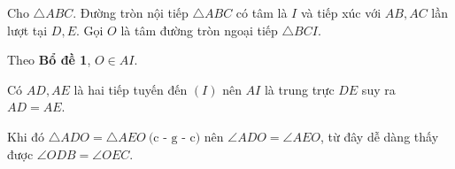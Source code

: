 
\begin{prob}[CGMO 2012/5]
	Cho $\triangle ABC$. Đường tròn nội tiếp $\triangle ABC$ có tâm là $I$ và tiếp xúc với $AB, AC$ lần lượt tại $D, E$. Gọi $O$ là tâm đường tròn ngoại tiếp $\triangle BCI$.
\end{prob}

\begin{center}	

\end{center}	

Theo \textbf{Bổ đề 1}, $O \in AI$. 

Có $AD, AE$ là hai tiếp tuyến đến $(I)$ nên $AI$ là trung trực $DE$ suy ra $AD = AE$. 

Khi đó $\triangle ADO = \triangle AEO \ \text{(c - g - c)}$ nên $\angle ADO = \angle AEO$, từ đây dễ dàng thấy được $\angle ODB = \angle OEC$.